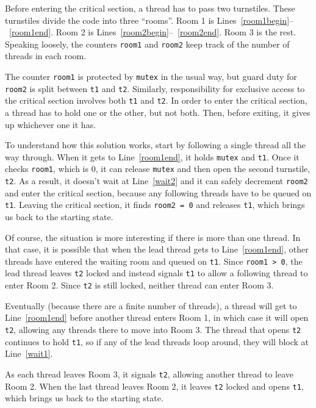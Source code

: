 \documentclass{book}
\begin{document}
Before entering the critical section, a thread has to pass two
turnstiles.  These turnstiles divide the code into three ``rooms''.
Room 1 is Lines~\ref{room1begin}--~\ref{room1end}.  Room 2 is
Lines~\ref{room2begin}--~\ref{room2end}.  Room 3 is the rest.
Speaking loosely, the counters {\tt room1} and {\tt room2} keep track
of the number of threads in each room.

The counter {\tt room1} is protected by {\tt mutex} in the usual way,
but guard duty for {\tt room2} is split between {\tt t1} and {\tt t2}.
Similarly, responsibility for exclusive access to the critical section
involves both {\tt t1} and {\tt t2}.  In order to enter the critical
section, a thread has to hold one or the other, but not both.  Then,
before exiting, it gives up whichever one it has.

To understand how this solution works, start by following a single
thread all the way through.  When it gets to Line~\ref{room1end}, it
holds {\tt mutex} and {\tt t1}.  Once it checks {\tt room1}, which is
0, it can release {\tt mutex} and then open the second turnstile, {\tt
t2}.  As a result, it doesn't wait at Line~\ref{wait2} and it can
safely decrement {\tt room2} and enter the critical section, because
any following threads have to be queued on {\tt t1}.  Leaving the
critical section, it finds {\tt room2 = 0} and releases {\tt t1},
which brings us back to the starting state.

Of course, the situation is more interesting if there is more than one
thread.  In that case, it is possible that when the lead thread gets
to Line~\ref{room1end}, other threads have entered the waiting room
and queued on {\tt t1}.  Since {\tt room1 > 0}, the lead thread leaves
{\tt t2} locked and instead signals {\tt t1} to allow a following
thread to enter Room 2.  Since {\tt t2} is still locked, neither
thread can enter Room 3.

Eventually (because there are a finite number of threads), a thread
will get to Line~\ref{room1end} before another thread enters Room 1, in which
case it will open {\tt t2}, allowing any threads there to move into
Room 3.  The thread that opens {\tt t2} continues to hold {\tt t1}, so
if any of the lead threads loop around, they will block at Line~\ref{wait1}.

As each thread leaves Room 3, it signals {\tt t2}, allowing another
thread to leave Room 2.  When the last thread leaves Room 2, it leaves
{\tt t2} locked and opens {\tt t1}, which brings us back to the
starting state.
\end{document}
